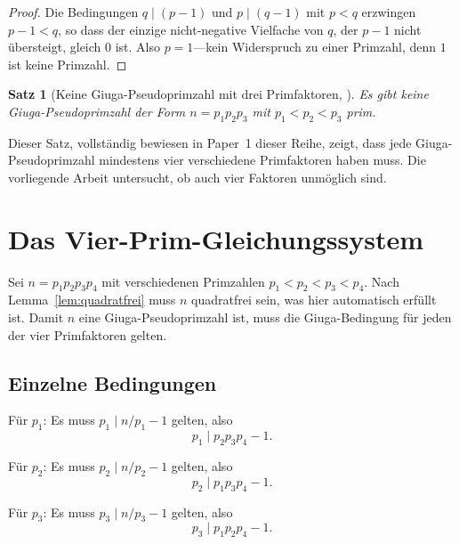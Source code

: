 \documentclass[12pt,a4paper]{amsart}
\newtheorem{theorem}{Satz}[section]
\theoremstyle{definition}
\begin{document}
\begin{proof}
Die Bedingungen $q \mid (p-1)$ und $p \mid (q-1)$ mit $p < q$ erzwingen
$p - 1 < q$, so dass der einzige nicht-negative Vielfache von $q$, der
$p - 1$ nicht übersteigt, gleich $0$ ist.  Also $p = 1$---kein Widerspruch
zu einer Primzahl, denn $1$ ist keine Primzahl.
\end{proof}

\begin{theorem}[Keine Giuga-Pseudoprimzahl mit drei Primfaktoren, {\cite{FuhrmannPaper1}}]
\label{satz:dreiprim}
Es gibt keine Giuga-Pseudoprimzahl der Form $n = p_1 p_2 p_3$ mit
$p_1 < p_2 < p_3$ prim.
\end{theorem}

Dieser Satz, vollständig bewiesen in Paper~1 dieser Reihe, zeigt, dass jede
Giuga-Pseudoprimzahl mindestens vier verschiedene Primfaktoren haben muss.
Die vorliegende Arbeit untersucht, ob auch vier Faktoren unmöglich sind.

\section{Das Vier-Prim-Gleichungssystem}
\label{sec:system}

Sei $n = p_1 p_2 p_3 p_4$ mit verschiedenen Primzahlen $p_1 < p_2 < p_3 < p_4$.
Nach Lemma~\ref{lem:quadratfrei} muss $n$ quadratfrei sein, was hier automatisch
erfüllt ist.  Damit $n$ eine Giuga-Pseudoprimzahl ist, muss die Giuga-Bedingung
für jeden der vier Primfaktoren gelten.

\subsection{Einzelne Bedingungen}

Für $p_1$: Es muss $p_1 \mid n/p_1 - 1$ gelten, also
\begin{equation}
  p_1 \mid p_2 p_3 p_4 - 1.
  \tag{G1}
  \label{eq:G1}
\end{equation}

Für $p_2$: Es muss $p_2 \mid n/p_2 - 1$ gelten, also
\begin{equation}
  p_2 \mid p_1 p_3 p_4 - 1.
  \tag{G2}
  \label{eq:G2}
\end{equation}

Für $p_3$: Es muss $p_3 \mid n/p_3 - 1$ gelten, also
\begin{equation}
  p_3 \mid p_1 p_2 p_4 - 1.
  \tag{G3}
  \label{eq:G3}
\end{equation}
\end{document}

